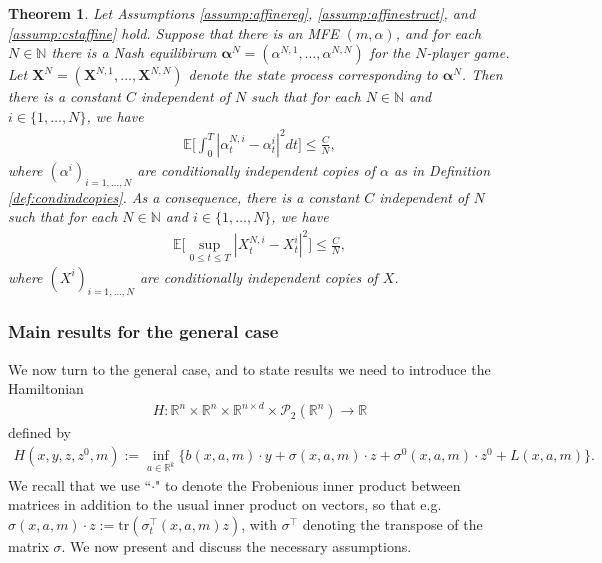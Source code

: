 \documentclass[11pt,reqno]{amsart}
\numberwithin{equation}{section}
\newtheorem{theorem}{Theorem}[section]
\theoremstyle{definition}
\def\E{{\mathbb E}}
\def\R{{\mathbb R}}
\def\N{{\mathbb N}}
\def\tr{{\mathrm{tr}}}
\newcommand{\bX}{\mathbf{X}}
\newcommand{\spt}{\mathcal{P}_2(\R^n)}
\def \E{\mathbb{E}}
\def \N{\mathbb{N}}
\def \R{\mathbb{R}}
\begin{document}
\begin{theorem} \label{thm:pocaffine}
Let Assumptions \ref{assump:affinereg}, \ref{assump:affinestruct}, and \ref{assump:cstaffine} hold. Suppose that there is an MFE $(m,\alpha)$, and for each $N \in \N$ there is a Nash equilibirum $\bm \alpha^N = (\alpha^{N,1},\dots,\alpha^{N,N})$ for the $N$-player game. Let $\bX^N = (\bX^{N,1},\dots,\bX^{N,N})$ denote the state process corresponding to $\bm \alpha^N$. Then there is a constant $C$ independent of $N$ such that for each $N \in \N$ and $i \in \{1,\dots,N\}$, we have
\begin{align*}
\E\bigg[\int_0^T |\alpha_t^{N,i} - \alpha_t^{i}|^2 dt \bigg] \leq \frac{C}{N}, 
\end{align*}
where $(\alpha^i)_{i= 1,\dots,N}$ are conditionally independent copies of $\alpha$ as in Definition \ref{def:condindcopies}.
As a consequence, there is a constant $C$ independent of $N$ such that for each $N \in \N$  and $i \in \{1,\dots,N\}$, we have 
\begin{align*}
\E\Big[\sup_{0 \leq t \leq T} |X_t^{N,i} - X_t^i|^2\Big] \leq \frac{C}{N}, 
\end{align*}
where $(X^i)_{i = 1,\dots,N}$ are conditionally independent copies of $X$.
\end{theorem}


\subsubsection{Main results for the general case}

We now turn to the general case, and to state results we need to introduce the Hamiltonian
\begin{align} 
H   : \R^n \times \R^n \times\R^{n\times d} \times \spt \to \R
\end{align}
 defined by 
\begin{align} \label{def:hamiltonian}
  H(x,y,z,z^0,m) := \inf_{a \in \R^k} \bigg\{b(x,a,m) \cdot y + \sigma(x,a,m) \cdot z + \sigma^0(x,a,m) \cdot z^0 + L(x,a,m) \bigg\}. 
\end{align}
We recall that we use ``$\cdot$" to denote the Frobenious inner product between matrices in addition to the usual inner product on vectors, so that e.g. $\sigma(x,a,m) \cdot z := \tr(\sigma_t^\top(x,a,m) z)$, with $\sigma^\top$ denoting the transpose of the matrix $\sigma$. 
We now present and discuss the necessary assumptions.
\end{document}

